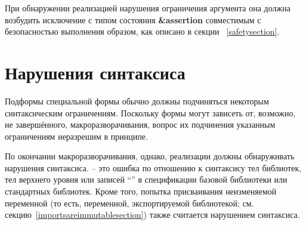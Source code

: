 При обнаружении реализацией нарушения ограничения аргумента она должна возбудить исключение
с типом состояния {\bfseries\cf\&assertion} совместимым с безопасностью выполнения образом, как описано в
секции ~\ref{safetysection}.\vspace{3mm}

\section{Нарушения синтаксиса}\vspace{3mm}

Подформы специальной формы обычно должны подчиняться некоторым синтаксическим
ограничениям. Поскольку формы могут зависеть от, возможно, не завершённого,
макроразворачивания, вопрос их подчинения указанным ограничениям неразрешим в принципе.

По окончании макроразворачивания, однако, реализации должны обнаруживать нарушения
синтаксиса.  -- это ошибка по отношению к синтаксису тел библиотек,
тел верхнего уровня или записей ``\exprtype'' в спецификации базовой библиотеки или
стандартных библиотек. Кроме того, попытка присваивания неизменяемой переменной (то есть,
переменной, экспортируемой библиотекой; см. секцию~\ref{importsareimmutablesection}) также
считается нарушением синтаксиса.


